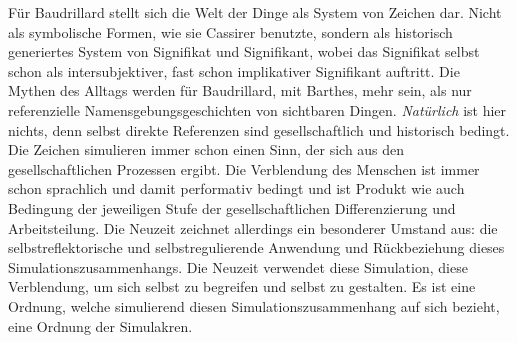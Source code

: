 \documentclass[a4paper,11pt]{article}
\begin{document}
Für Baudrillard stellt sich die Welt der Dinge als System von Zeichen dar.
Nicht als symbolische Formen, wie sie Cassirer benutzte, sondern als
historisch generiertes System von Signifikat und Signifikant, wobei das
Signifikat selbst schon als intersubjektiver, fast schon implikativer
Signifikant auftritt. Die Mythen des Alltags werden für Baudrillard, mit
Barthes, mehr sein, als nur referenzielle Namensgebungsgeschichten von
sichtbaren Dingen. \emph{Natürlich} ist hier nichts, denn selbst direkte
Referenzen sind gesellschaftlich und historisch bedingt. Die Zeichen
simulieren immer schon einen Sinn, der sich aus den gesellschaftlichen
Prozessen ergibt. Die Verblendung des Menschen ist immer schon sprachlich und
damit performativ bedingt und ist Produkt wie auch Bedingung der jeweiligen
Stufe der gesellschaftlichen Differenzierung und Arbeitsteilung. Die Neuzeit
zeichnet allerdings ein besonderer Umstand aus: die selbstreflektorische und
selbstregulierende Anwendung und Rückbeziehung dieses
Simulationszusammenhangs. Die Neuzeit verwendet diese Simulation, diese
Verblendung, um sich selbst zu begreifen und selbst zu gestalten. Es ist eine
Ordnung, welche simulierend diesen Simulationszusammenhang auf sich bezieht,
eine Ordnung der Simulakren.
\end{document}
